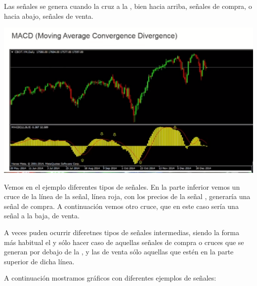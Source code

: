Las señales se genera cuando la  cruz a la , bien hacia arriba, señales de compra, o hacia abajo, señales de venta.

\begin{center}
    \includegraphics[scale=.80]{images/MACD.png}
\end{center}

Vemos en el ejemplo diferentes tipos de señales. En la parte inferior vemos un cruce de la línea de la señal, línea roja, con los precios de la señal , generaría una señal de compra. A continuación vemos otro cruce, que en este caso sería una señal a la baja, de venta.

A veces puden ocurrir diferetnes tipos de señales intermedias, siendo la forma más habitual el  y sólo hacer caso de aquellas señales de compra o cruces que se generan por debajo de la , y las de venta sólo aquellas que estén en la parte superior de dicha línea.

A continuación mostramos gráficos con diferentes ejemplos de señales:

